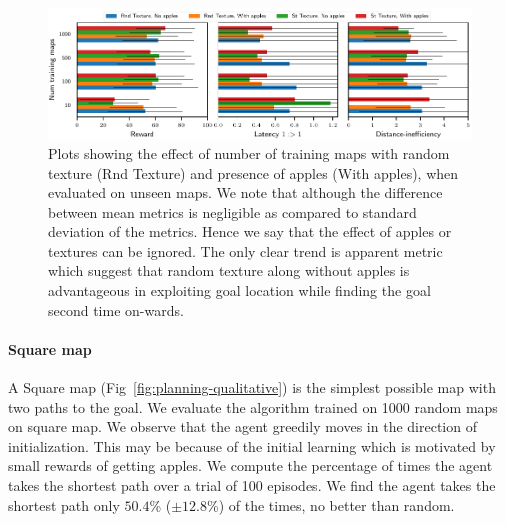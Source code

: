 \begin{figure}%
  \includegraphics[width=\linewidth]{images/plot_ntrain_summary.pdf}%
  \caption{Plots showing the effect of number of training maps with random texture (Rnd Texture) and presence of apples (With apples), when evaluated on unseen maps. We note that although the difference between mean metrics is negligible as compared to standard deviation of the metrics. Hence we say that the effect of apples or textures can be ignored.
  The only clear trend is apparent \LatencyOneGtOne{} metric which suggest that random texture along without apples is advantageous in exploiting goal location while finding the goal second time on-wards.}
  \label{fig:num-training-maps}
\end{figure}

\paragraph{Square map}
A Square map (Fig~\ref{fig:planning-qualitative}) is the simplest possible map with two paths to the goal.
We evaluate the algorithm trained on 1000 random maps on square map.
We observe that the agent greedily moves in the direction of
initialization.
This may be because of the initial learning which is
motivated by small rewards of getting apples.
We compute the percentage of times the agent takes the shortest path over a trial of 100 episodes.
We find the agent takes the shortest path only $50.4$\% ($\pm 12.8$\%) of the times, no better than random.

